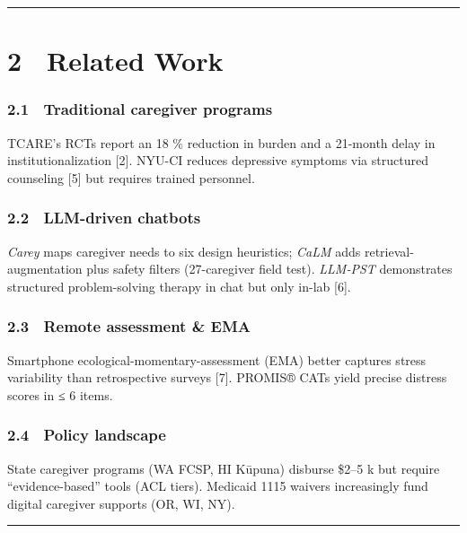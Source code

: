 \begin{center}\rule{0.5\linewidth}{0.5pt}\end{center}

\section{2 Related Work}\label{related-work}

\subsubsection{2.1 Traditional caregiver
programs}\label{traditional-caregiver-programs}

TCARE's RCTs report an 18 \% reduction in burden and a 21-month delay in
institutionalization {[}2{]}. NYU-CI reduces depressive symptoms via
structured counseling {[}5{]} but requires trained personnel.

\subsubsection{2.2 LLM-driven chatbots}\label{llm-driven-chatbots}

\emph{Carey} maps caregiver needs to six design heuristics; \emph{CaLM}
adds retrieval-augmentation plus safety filters (27-caregiver field
test). \emph{LLM-PST} demonstrates structured problem-solving therapy in
chat but only in-lab {[}6{]}.

\subsubsection{2.3 Remote assessment \&
EMA}\label{remote-assessment-ema}

Smartphone ecological-momentary-assessment (EMA) better captures stress
variability than retrospective surveys {[}7{]}. PROMIS® CATs yield
precise distress scores in ≤ 6 items.

\subsubsection{2.4 Policy landscape}\label{policy-landscape}

State caregiver programs (WA FCSP, HI Kūpuna) disburse \$2--5 k but
require ``evidence-based'' tools (ACL tiers). Medicaid 1115 waivers
increasingly fund digital caregiver supports (OR, WI, NY).

\begin{center}\rule{0.5\linewidth}{0.5pt}\end{center}

